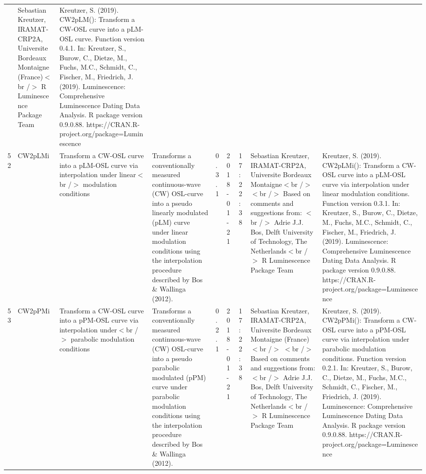 \begin{table}[ht]
\begin{tabular}{rllllllll}
 & Sebastian Kreutzer, IRAMAT-CRP2A, Universite Bordeaux Montaigne (France)$<$br /$>$  R Luminescence Package Team & Kreutzer, S. (2019). CW2pLM(): Transform a CW-OSL curve into a pLM-OSL curve. Function version 0.4.1. In: Kreutzer, S., Burow, C., Dietze, M., Fuchs, M.C., Schmidt, C., Fischer, M., Friedrich, J. (2019). Luminescence: Comprehensive Luminescence Dating Data Analysis. R package version 0.9.0.88. https://CRAN.R-project.org/package=Luminescence
 \\ 
  52 & CW2pLMi & Transform a CW-OSL curve into a pLM-OSL curve via interpolation under linear$<$br /$>$ modulation conditions & Transforms a conventionally measured continuous-wave (CW) OSL-curve into a pseudo linearly modulated (pLM) curve under linear modulation conditions using the interpolation procedure described by Bos \& Wallinga (2012). & 0.3.1 & 2018-01-21 & 17:22:38
 & Sebastian Kreutzer, IRAMAT-CRP2A, Universite Bordeaux Montaigne$<$br /$>$ $<$br /$>$ Based on comments and suggestions from: $<$br /$>$ Adrie J.J. Bos, Delft University of Technology, The Netherlands$<$br /$>$  R Luminescence Package Team & Kreutzer, S. (2019). CW2pLMi(): Transform a CW-OSL curve into a pLM-OSL curve via interpolation under linear modulation conditions. Function version 0.3.1. In: Kreutzer, S., Burow, C., Dietze, M., Fuchs, M.C., Schmidt, C., Fischer, M., Friedrich, J. (2019). Luminescence: Comprehensive Luminescence Dating Data Analysis. R package version 0.9.0.88. https://CRAN.R-project.org/package=Luminescence
 \\ 
  53 & CW2pPMi & Transform a CW-OSL curve into a pPM-OSL curve via interpolation under$<$br /$>$ parabolic modulation conditions & Transforms a conventionally measured continuous-wave (CW) OSL-curve into a pseudo parabolic modulated (pPM) curve under parabolic modulation conditions using the interpolation procedure described by Bos \& Wallinga (2012). & 0.2.1 & 2018-01-21 & 17:22:38
 & Sebastian Kreutzer, IRAMAT-CRP2A, Universite Bordeaux Montaigne (France)$<$br /$>$ $<$br /$>$ Based on comments and suggestions from: $<$br /$>$ Adrie J.J. Bos, Delft University of Technology, The Netherlands$<$br /$>$  R Luminescence Package Team & Kreutzer, S. (2019). CW2pPMi(): Transform a CW-OSL curve into a pPM-OSL curve via interpolation under parabolic modulation conditions. Function version 0.2.1. In: Kreutzer, S., Burow, C., Dietze, M., Fuchs, M.C., Schmidt, C., Fischer, M., Friedrich, J. (2019). Luminescence: Comprehensive Luminescence Dating Data Analysis. R package version 0.9.0.88. https://CRAN.R-project.org/package=Luminescence

\end{tabular}
\end{table}
